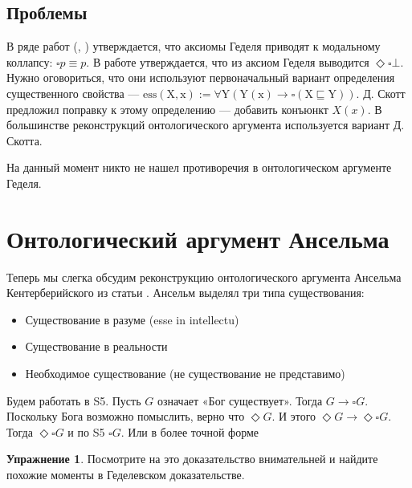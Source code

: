\documentclass[openany]{book}
\theoremstyle{plain}
\theoremstyle{definition}
\newtheorem{xrc}{Упражнение}[]
\begin{document}
\subsection{Проблемы}

В ряде работ (\cite{Sobel}, \cite{Fitting}) утверждается, что аксиомы Геделя приводят к модальному коллапсу: \(\square p \equiv p\). В работе \cite{Benzmuller} утверждается, что из аксиом Геделя выводится \(\Diamond \square \bot\). Нужно оговориться, что они используют первоначальный вариант определения существенного свойства --- \(\mathrm{ess(X, x) := \forall Y (Y(x) \to \square (X \sqsubseteq Y))}\). Д. Скотт предложил поправку к этому определению --- добавить конъюнкт \(X(x)\). В большинстве реконструкций онтологического аргумента используется вариант Д. Скотта.

На данный момент никто не нашел противоречия в онтологическом аргументе Геделя.

\section{Онтологический аргумент Ансельма}

Теперь мы слегка обсудим реконструкцию онтологического аргумента Ансельма Кентерберийского из статьи \cite{Ramharter}. Ансельм выделял три типа существования:
\begin{itemize}
    \item Существование в разуме (esse in intellectu)
    \item Существование в реальности
    \item Необходимое существование (не существование не представимо)
\end{itemize}
Будем работать в S5. Пусть \(G\) означает «Бог существует». Тогда \(G \to \square G\). Поскольку Бога возможно помыслить, верно что \(\Diamond G\). И этого \(\Diamond G \to \Diamond \square G\). Тогда \(\Diamond \square G\) и по S5 \(\square G\). Или в более точной форме 
\begin{prooftree}
\end{prooftree}

\begin{xrc}
    Посмотрите на это доказательство внимательней и найдите похожие моменты в Геделевском доказательстве.
\end{xrc}
\end{document}
